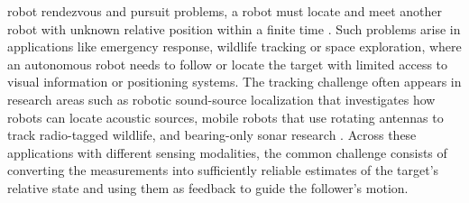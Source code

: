  robot rendezvous and pursuit problems, a robot must locate and meet another robot with unknown relative position within a finite time \cite{lin2003}. Such problems arise in applications like emergency response, wildlife tracking or space exploration, where an autonomous robot needs to follow or locate the target with limited access to visual information or positioning systems. The tracking challenge often appears in research areas such as robotic sound-source localization that investigates how robots can locate acoustic sources, mobile robots that use rotating antennas to track radio-tagged wildlife, and bearing-only sonar research \cite{rascon2017review,tokekar2011active,nardone1981observability,lingren1978position}. Across these applications with different sensing modalities, the common challenge consists of converting the measurements into sufficiently reliable estimates of the target's relative state and using them as feedback to guide the follower's motion.